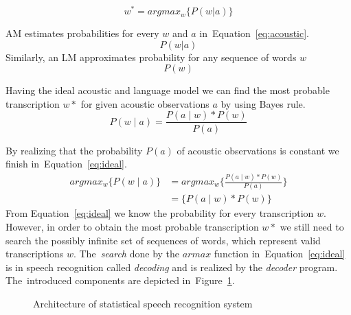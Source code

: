 \begin{equation}\label{eq:asr}
    w^* = argmax_{w}\{P(w|a)\} 
\end{equation}

\ac{AM} estimates probabilities for every $w$ and $a$ in~Equation~\ref{eq:acoustic}.
\begin{equation}\label{eq:acoustic}
    P(w|a)
\end{equation}
Similarly, an \ac{LM} approximates probability for any sequence of words $w$
\begin{equation}
    P(w)
\end{equation}

Having the ideal acoustic and language model 
we can find the most probable transcription $w*$ 
for given acoustic observations $a$ by using Bayes rule.
\begin{equation}
    P(w \mid a) = \frac{P(a \mid w) * P(w)}{P(a)}
\end{equation}

By realizing that the probability $P(a)$ of acoustic observations is constant we finish in~Equation~\ref{eq:ideal}.
\begin{align}\label{eq:ideal}
    argmax_w\{P(w \mid a)\} &= argmax_w \{\frac{P(a \mid w) * P(w)}{P(a)}\}\\
                            &= \{P(a \mid w) * P(w)\}
\end{align}
From Equation~\ref{eq:ideal} we know the probability for every transcription $w$. However, in order to obtain the most probable transcription $w*$ we still need to search the possibly infinite set of sequences of words, which represent valid transcriptions $w$. The~{\it search}\/ done by the $armax$ function in~Equation~\ref{eq:ideal} is in speech recognition called {\it decoding}\/ and is realized by the {\it decoder}\/ program. The~introduced components are depicted in~Figure~\ref{fig:components}.
\begin{figure}[!htp]
    \begin{center}
    
    \caption{Architecture of statistical speech recognition system\cite{ney1990acoustic}}
    \label{fig:components} 
    \end{center}
\end{figure}

